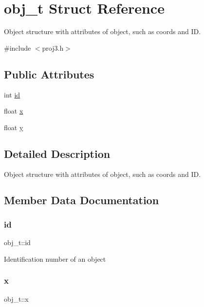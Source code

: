 \hypertarget{structobj__t}{}\section{obj\+\_\+t Struct Reference}
\label{structobj__t}


Object structure with attributes of object, such as coords and ID.  




{\ttfamily \#include $<$proj3.\+h$>$}

\subsection*{Public Attributes}
\begin{DoxyCompactItemize}
\item 
int \mbox{\hyperlink{structobj__t_a9424f3c99733a13d191bbe6c88a837c1}{id}}
\item 
float \mbox{\hyperlink{structobj__t_aba0ea7a3e1cafd617f839a313d0b4584}{x}}
\item 
float \mbox{\hyperlink{structobj__t_aab2451e07e3c283863a675e6f4354cf5}{y}}
\end{DoxyCompactItemize}


\subsection{Detailed Description}
Object structure with attributes of object, such as coords and ID. 

\subsection{Member Data Documentation}
\mbox{\label{structobj__t_a9424f3c99733a13d191bbe6c88a837c1}} 
\subsubsection{\texorpdfstring{id}{id}}
{\footnotesize\ttfamily obj\+\_\+t\+::id}

Identification number of an object \mbox{\label{structobj__t_aba0ea7a3e1cafd617f839a313d0b4584}} 
\subsubsection{\texorpdfstring{x}{x}}
{\footnotesize\ttfamily obj\+\_\+t\+::x}

